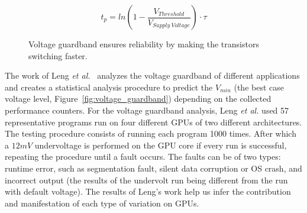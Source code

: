 \begin{equation}
    t_p=ln(1-\frac{V_{Threshold}}{V_{Supply \: Voltage}})\cdot\tau
    \label{eq:tp_v_scaling}
\end{equation}


\begin{figure}[!htb]
    \centering
  \begin{subfigmatrix}{2}
  \end{subfigmatrix}
  \caption{Voltage guardband ensures reliability by making the transistors switching faster.}
\end{figure}

The work of Leng \textit{et al.}~\cite{leng_safe_2015} analyzes the voltage guardband of different applications and creates a statistical analysis procedure to predict the $V_{min}$ (the best case voltage level, Figure~\ref{fig:voltage_guardband}) depending on the collected performance counters. For the voltage guardband analysis, Leng \textit{et al.} used 57 representative programs run on four different GPUs of two different architectures. The testing procedure consists of running each program 1000 times. After which a $12mV$ undervoltage is performed on the GPU core if every run is successful, repeating the procedure until a fault occurs. The faults can be of two types: runtime error, such as segmentation fault, silent data corruption or OS crash, and incorrect output (the results of the undervolt run being different from the run with default voltage). The results of Leng's work help us infer the contribution and manifestation of each type of variation on GPUs.


